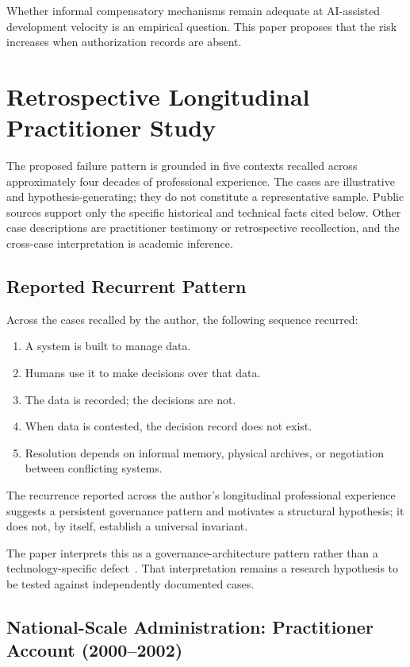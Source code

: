 \documentclass[conference]{IEEEtran}
\begin{document}
Whether informal compensatory mechanisms remain adequate at AI-assisted
development velocity is an empirical question. This paper proposes that the
risk increases when authorization records are absent.

\section{Retrospective Longitudinal Practitioner Study}

The proposed failure pattern is grounded in five contexts recalled across
approximately four decades of professional experience. The cases are
illustrative and hypothesis-generating; they do not constitute a representative
sample. Public sources support only the specific historical and technical facts
cited below. Other case descriptions are practitioner testimony or retrospective
recollection, and the cross-case interpretation is academic inference.

\subsection{Reported Recurrent Pattern}

Across the cases recalled by the author, the following sequence recurred:

\begin{enumerate}
  \item A system is built to manage data.
  \item Humans use it to make decisions over that data.
  \item The data is recorded; the decisions are not.
  \item When data is contested, the decision record does not exist.
  \item Resolution depends on informal memory, physical archives, or negotiation between conflicting systems.
\end{enumerate}

The recurrence reported across the author's longitudinal professional experience
suggests a persistent governance pattern and motivates a structural hypothesis;
it does not, by itself, establish a universal invariant.

The paper interprets this as a governance-architecture pattern rather than a
technology-specific defect~\cite{trist1951}. That interpretation remains a
research hypothesis to be tested against independently documented cases.

\subsection{National-Scale Administration: Practitioner Account (2000--2002)}
\end{document}
